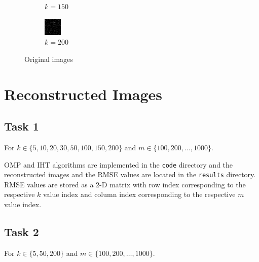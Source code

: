 \documentclass[a4paper, landscape]{article}
\begin{document}
\begin{figure}[H]
\begin{subfigure}{0.09\linewidth}
        \caption{$k = 150$}
    \end{subfigure}
    \begin{subfigure}{0.09\linewidth}
        \centering
        \includegraphics[width=\linewidth]{k = 200.png}
        \caption{$k = 200$}
    \end{subfigure}
    \caption{Original images}
    \label{fig:o}
\end{figure}
\section{Reconstructed Images}
\subsection{Task 1}
For $k \in \{5,10,20,30,50,100,150,200\}$ and $m \in \{100,200,\ldots,1000\}$.

OMP and IHT algorithms are implemented in the \verb!code! directory and the reconstructed images and the RMSE values are located in the \verb!results! directory. RMSE values are stored as a 2-D matrix with row index corresponding to the respective $k$ value index and column index corresponding to the respective $m$ value index.
\subsection{Task 2}
For $k \in \{5,50,200\}$ and $m \in \{100,200,\ldots,1000\}$.
\end{document}
